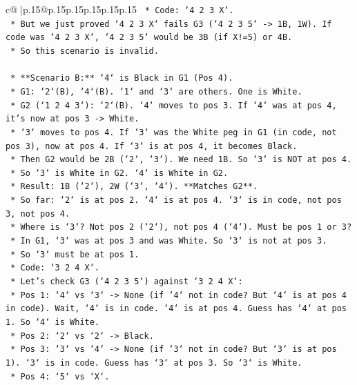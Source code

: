 \documentclass{article}
\begin{document}
{\begin{supertabular}{c@{$\;$}|p{.15\linewidth}@{}p{.15\linewidth}p{.15\linewidth}p{.15\linewidth}p{.15\linewidth}p{.15\linewidth}}
{{{\texttt{        *   Code: `4 2 3 X`.} \\
\texttt{        *   But we just proved `4 2 3 X` fails G3 (`4 2 3 5` {-}> 1B, 1W). If code was `4 2 3 X`, `4 2 3 5` would be 3B (if X!=5) or 4B.} \\
\texttt{        *   So this scenario is invalid.} \\
\\ 
\texttt{    *   **Scenario B:** `4` is Black in G1 (Pos 4).} \\
\texttt{        *   G1: `2`(B), `4`(B). `1` and `3` are others. One is White.} \\
\texttt{        *   G2 (`1 2 4 3`): `2`(B). `4` moves to pos 3. If `4` was at pos 4, it's now at pos 3 {-}> White.} \\
\texttt{        *   `3` moves to pos 4. If `3` was the White peg in G1 (in code, not pos 3), now at pos 4. If `3` is at pos 4, it becomes Black.} \\
\texttt{        *   Then G2 would be 2B (`2`, `3`). We need 1B. So `3` is NOT at pos 4.} \\
\texttt{        *   So `3` is White in G2. `4` is White in G2.} \\
\texttt{        *   Result: 1B (`2`), 2W (`3`, `4`). **Matches G2**.} \\
\texttt{        *   So far: `2` is at pos 2. `4` is at pos 4. `3` is in code, not pos 3, not pos 4.} \\
\texttt{        *   Where is `3`? Not pos 2 (`2`), not pos 4 (`4`). Must be pos 1 or 3?} \\
\texttt{        *   In G1, `3` was at pos 3 and was White. So `3` is not at pos 3.} \\
\texttt{        *   So `3` must be at pos 1.} \\
\texttt{        *   Code: `3 2 4 X`.} \\
\texttt{        *   Let's check G3 (`4 2 3 5`) against `3 2 4 X`:} \\
\texttt{            *   Pos 1: `4` vs `3` {-}> None (if `4` not in code? But `4` is at pos 4 in code). Wait, `4` is in code. `4` is at pos 4. Guess has `4` at pos 1. So `4` is White.} \\
\texttt{            *   Pos 2: `2` vs `2` {-}> Black.} \\
\texttt{            *   Pos 3: `3` vs `4` {-}> None (if `3` not in code? But `3` is at pos 1). `3` is in code. Guess has `3` at pos 3. So `3` is White.} \\
\texttt{            *   Pos 4: `5` vs `X`.} \\
}}}
\end{supertabular}}
\end{document}
